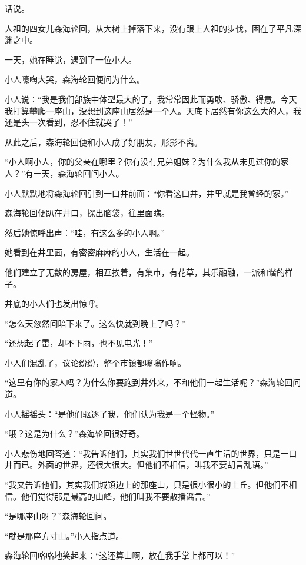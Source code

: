 
\begin{this_body}

话说。

人祖的四女儿森海轮回，从大树上掉落下来，没有跟上人祖的步伐，困在了平凡深渊之中。

一天，她在睡觉，遇到了一位小人。

小人嚎啕大哭，森海轮回便问为什么。

小人说：“我是我们部族中体型最大的了，我常常因此而勇敢、骄傲、得意。今天我打算攀爬一座山，没想到这座山居然是一个人。天底下居然有你这么大的人，我还是头一次看到，忍不住就哭了！”

从此之后，森海轮回便和小人成了好朋友，形影不离。

“小人啊小人，你的父亲在哪里？你有没有兄弟姐妹？为什么我从未见过你的家人？”有一天，森海轮回问小人。

小人默默地将森海轮回引到一口井前面：“你看这口井，井里就是我曾经的家。”

森海轮回便趴在井口，探出脑袋，往里面瞧。

然后她惊呼出声：“哇，有这么多的小人啊。”

她看到在井里面，有密密麻麻的小人，生活在一起。

他们建立了无数的房屋，相互挨着，有集市，有花草，其乐融融，一派和谐的样子。

井底的小人们也发出惊呼。

“怎么天忽然间暗下来了。这么快就到晚上了吗？”

“还想起了雷，却不下雨，也不见电光！”

小人们混乱了，议论纷纷，整个市镇都嗡嗡作响。

“这里有你的家人吗？为什么你要跑到井外来，不和他们一起生活呢？”森海轮回问道。

小人摇摇头：“是他们驱逐了我，他们认为我是一个怪物。”

“哦？这是为什么？”森海轮回很好奇。

小人悲伤地回答道：“我告诉他们，其实我们世世代代一直生活的世界，只是一口井而已。外面的世界，还很大很大。但他们不相信，叫我不要胡言乱语。”

“我又告诉他们，其实我们城镇边上的那座山，只是很小很小的土丘。但他们不相信。他们觉得那是最高的山峰，他们叫我不要散播谣言。”

“是哪座山呀？”森海轮回问。

“就是那座方寸山。”小人指点道。

森海轮回咯咯地笑起来：“这还算山啊，放在我手掌上都可以！”


\end{this_body}

